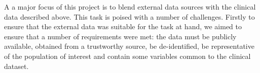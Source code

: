 \documentclass{article}
\begin{document}
A a major focus of this project is to blend external data sources with the clinical data described above. This task is poised with a number of challenges. Firstly to ensure that the external data was suitable for the task at hand, we aimed to ensure that a number of requirements were met: the data must be publicly available, obtained from a trustworthy source, be de-identified, be representative of the population of interest and contain some variables common to the clinical dataset.
\end{document}
